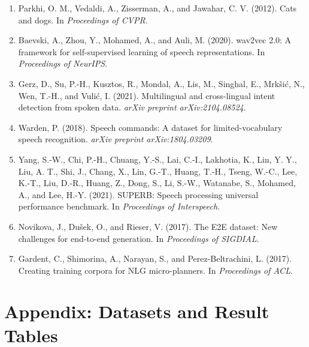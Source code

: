\documentclass[11pt]{article}
\begin{document}
\begin{enumerate}[leftmargin=1.2em,itemsep=0em]
    \item \label{ref:oxfordpet} Parkhi, O. M., Vedaldi, A., Zisserman, A., and Jawahar, C. V. (2012). Cats and dogs. In \textit{Proceedings of CVPR}.
    \item \label{ref:wav2vec} Baevski, A., Zhou, Y., Mohamed, A., and Auli, M. (2020). wav2vec 2.0: A framework for self-supervised learning of speech representations. In \textit{Proceedings of NeurIPS}.
    \item \label{ref:minds14} Gerz, D., Su, P.-H., Kusztos, R., Mondal, A., Lis, M., Singhal, E., Mrkšić, N., Wen, T.-H., and Vulić, I. (2021). Multilingual and cross-lingual intent detection from spoken data. \textit{arXiv preprint arXiv:2104.08524}.
    \item \label{ref:speechcommands} Warden, P. (2018). Speech commands: A dataset for limited-vocabulary speech recognition. \textit{arXiv preprint arXiv:1804.03209}.
    \item \label{ref:superb} Yang, S.-W., Chi, P.-H., Chuang, Y.-S., Lai, C.-I., Lakhotia, K., Lin, Y. Y., Liu, A. T., Shi, J., Chang, X., Lin, G.-T., Huang, T.-H., Tseng, W.-C., Lee, K.-T., Liu, D.-R., Huang, Z., Dong, S., Li, S.-W., Watanabe, S., Mohamed, A., and Lee, H.-Y. (2021). SUPERB: Speech processing universal performance benchmark. In \textit{Proceedings of Interspeech}.
    \item \label{ref:e2e} Novikova, J., Dušek, O., and Rieser, V. (2017). The E2E dataset: New challenges for end-to-end generation. In \textit{Proceedings of SIGDIAL}.
    \item \label{ref:webnlg} Gardent, C., Shimorina, A., Narayan, S., and Perez-Beltrachini, L. (2017). Creating training corpora for NLG micro-planners. In \textit{Proceedings of ACL}.
\end{enumerate}

\appendix
\section*{Appendix: Datasets and Result Tables}
\end{document}
